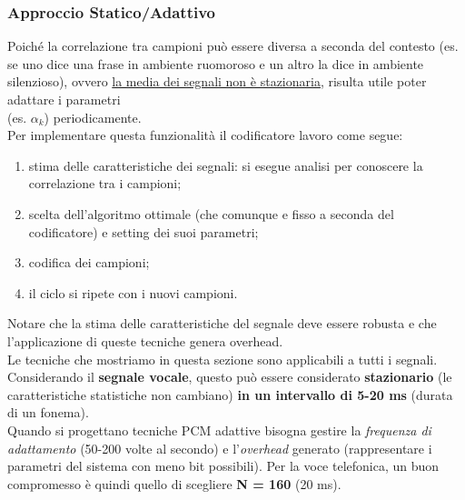 \documentclass{article}
\begin{document}
			\subsubsection{Approccio Statico/Adattivo}
				Poiché la correlazione tra campioni può essere diversa a seconda del contesto (es. se uno dice una frase in ambiente ruomoroso e un altro la dice in ambiente silenzioso), ovvero \underline{la media dei segnali non è stazionaria}, risulta utile poter adattare i parametri \\(es. \textit{$\alpha_{k}$}) periodicamente.
				\\Per implementare questa funzionalità il codificatore lavoro come segue:
				\begin{figure}[ht!]
				\end{figure}
				\begin{enumerate}
					\item stima delle caratteristiche dei segnali: si esegue analisi per conoscere la correlazione tra i campioni;
					\item scelta dell'algoritmo ottimale (che comunque e fisso a seconda del codificatore) e setting dei suoi parametri;
					\item codifica dei campioni;
					\item il ciclo si ripete con i nuovi campioni.
				\end{enumerate}
				Notare che la stima delle caratteristiche del segnale deve essere robusta e che l'applicazione di queste tecniche genera overhead.
				\\Le tecniche che mostriamo in questa sezione sono applicabili a tutti i segnali. Considerando il \textbf{segnale vocale}, questo può essere considerato \textbf{stazionario} (le caratteristiche statistiche non cambiano) \textbf{in un intervallo di 5-20 ms} (durata di un fonema).
				\\Quando si progettano tecniche PCM adattive bisogna gestire la \textit{frequenza di adattamento} (50-200 volte al secondo) e l'\textit{overhead} generato (rappresentare i parametri del sistema con meno bit possibili). Per la voce telefonica, un buon compromesso è quindi quello di scegliere \textbf{N = 160} (20 ms).
\end{document}
